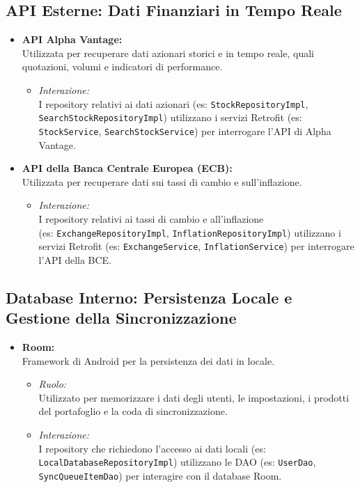 \documentclass{article}
\begin{document}
\subsection{API Esterne: Dati Finanziari in Tempo
Reale}\label{subsec:api-esterne:-dati-finanziari-in-tempo-reale}
\begin{itemize}
  \item \textbf{API Alpha Vantage:}\\
    Utilizzata per recuperare dati azionari storici e in tempo reale, quali
    quotazioni, volumi e indicatori di performance.
    \begin{itemize}
      \item \textit{Interazione:}\\
        I repository relativi ai dati azionari (es:
        \texttt{StockRepositoryImpl}, \texttt{SearchStockRepositoryImpl})
        utilizzano i servizi Retrofit (es: \texttt{StockService},
        \texttt{SearchStockService}) per interrogare l'API di Alpha Vantage.
    \end{itemize}

  \item \textbf{API della Banca Centrale Europea (ECB):}\\
    Utilizzata per recuperare dati sui tassi di cambio e sull'inflazione.
    \begin{itemize}
      \item \textit{Interazione:}\\
        I repository relativi ai tassi di cambio e all'inflazione \\(es:
        \texttt{ExchangeRepositoryImpl}, \texttt{InflationRepositoryImpl})
        utilizzano i servizi Retrofit (es: \texttt{ExchangeService},
        \texttt{InflationService}) per interrogare l'API della BCE\@.
    \end{itemize}
\end{itemize}

\subsection{Database Interno: Persistenza Locale e Gestione della
Sincronizzazione}\label{subsec:database-interno:-persistenza-locale-e-gestione-della-sincronizzazione}
\begin{itemize}
  \item \textbf{Room:}\\
    Framework di Android per la persistenza dei dati in locale.
    \begin{itemize}
      \item \textit{Ruolo:}\\
        Utilizzato per memorizzare i dati degli utenti, le impostazioni, i
        prodotti del portafoglio e la coda di sincronizzazione.

      \item \textit{Interazione:}\\
        I repository che richiedono l'accesso ai dati locali (es:
        \texttt{LocalDatabaseRepositoryImpl}) utilizzano le DAO (es:
        \texttt{UserDao}, \texttt{SyncQueueItemDao}) per interagire con il
        database Room.
    \end{itemize}
\end{itemize}
\end{document}
